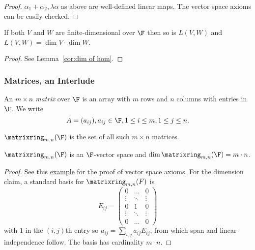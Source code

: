 \documentclass[a4paper]{article}
\newcommand*{\M}{\matrixring}
\theoremstyle{definition}
\begin{document}
\begin{proof}
  \(\alpha_1+\alpha_2, \lambda\alpha\) as above are well-defined linear maps. The vector space axioms can be easily checked.
\end{proof}

\begin{proposition}
  \label{prop:dimension of linear map space}
  If both \(V\) and \(W\) are finite-dimensional over \(\F\) then so is \(L(V,W)\) and \(L(V,W) = \dim V \cdot \dim W\).
\end{proposition}

\begin{proof}
  See Lemma~\ref{cor:dim of hom}.
\end{proof}

\subsubsection{Matrices, an Interlude}

\begin{definition}[Matrix]
  An \emph{\(m\times n\) matrix} over \(\F\) is an array with \(m\) rows and \(n\) columns with entries in \(\F\). We write
  \[
A = (a_{ij}), a_{ij}\in\F, 1\leq i \leq m, 1\leq j \leq n.
  \]
\end{definition}

\begin{definition}
  \(\M_{m,n}(\F)\) is the set of all such \(m\times n\) matrices.
\end{definition}

\begin{proposition}
  \(\M_{m,n}(\F)\) is an \(\F\)-vector space and \(\dim \M_{m,n}(\F) = m\cdot n\).
\end{proposition}

\begin{proof}
  See this \hyperref[eg:matrix as V]{example} for the proof of vector space axioms. For the dimension claim, a standard basis for \(\M_{m,n}(F)\) is
  \[
    E_{ij}=
    \begin{pmatrix}
      0 & \dots & 0 \\
      \vdots & \ddots & \vdots \\
      0 & 1 & 0 \\
      \vdots & \ddots & \vdots \\
      0 & \dots & 0 
    \end{pmatrix}
  \]
  with \(1\) in the \((i,j)\)th entry so \(a_{ij} = \sum_{i,j}^{} a_{ij}E_{ij}\), from which span and linear independence follow. The basis has cardinality \(m\cdot n\).
\end{proof}
\end{document}
